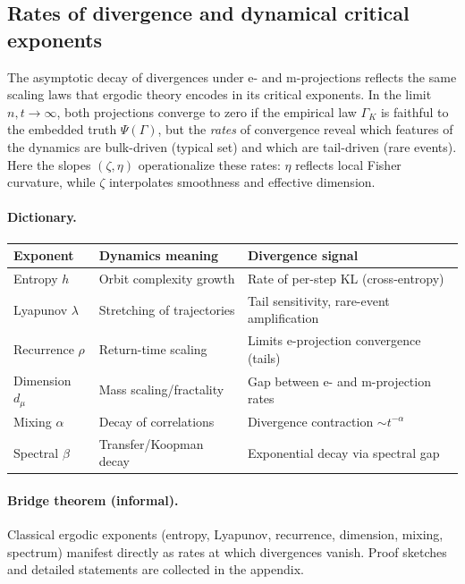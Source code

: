 \documentclass[11pt]{article}
\newcommand{\1}{\mathbf{1}}
\begin{document}
\subsection{Rates of divergence and dynamical critical exponents}

The asymptotic decay of divergences under e- and m-projections reflects the same scaling laws that ergodic theory encodes in its critical exponents. In the limit $n,t\to\infty$, both projections converge to zero if the empirical law $\Gamma_K$ is faithful to the embedded truth $\Psi(\Gamma)$, but the \emph{rates} of convergence reveal which features of the dynamics are bulk-driven (typical set) and which are tail-driven (rare events). Here the slopes $(\zeta,\eta)$ operationalize these rates: $\eta$ reflects local Fisher curvature, while $\zeta$ interpolates smoothness and effective dimension.

\paragraph{Dictionary.}
\begin{center}
\begin{tabular}{|l|l|l|}
\hline
\textbf{Exponent} & \textbf{Dynamics meaning} & \textbf{Divergence signal} \\
\hline
Entropy $h$ & Orbit complexity growth & Rate of per-step KL (cross-entropy) \\
Lyapunov $\lambda$ & Stretching of trajectories & Tail sensitivity, rare-event amplification \\
Recurrence $\rho$ & Return-time scaling & Limits e-projection convergence (tails) \\
Dimension $d_\mu$ & Mass scaling/fractality & Gap between e- and m-projection rates \\
Mixing $\alpha$ & Decay of correlations & Divergence contraction $\sim t^{-\alpha}$ \\
Spectral $\beta$ & Transfer/Koopman decay & Exponential decay via spectral gap \\
\hline
\end{tabular}
\end{center}

\paragraph{Bridge theorem (informal).}
Classical ergodic exponents (entropy, Lyapunov, recurrence, dimension, mixing, spectrum)
manifest directly as rates at which divergences vanish.
Proof sketches and detailed statements are collected in the appendix.
\end{document}
